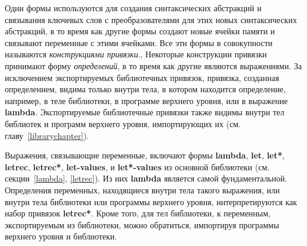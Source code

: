 Одни формы используются для создания синтаксических абстракций и связывания ключевых
слов с преобразователями для этих новых синтаксических абстракций, в то время как другие формы
создают новые ячейки памяти и связывают переменные с этими ячейками. Все эти
формы в совокупности называются {\em конструкциями привязки}., Некоторые
конструкции привязки принимают форму \textit{определений}, в то время как
другие являются выражениями. За исключением экспортируемых библиотечных привязок, привязка,
созданная определением, видима только внутри тела, в котором находится определение,
например, в теле библиотеки, в программе верхнего уровня, или в выражение {\cf\bfseries
  lambda}. Экспортируемые библиотечные привязки также видимы внутри тел библиотек и программ
верхнего уровня, импортирующих их (см. главу~\ref{librarychapter}).

Выражения, связывающие переменные, включают формы {\cf\bfseries lambda}, {\cf\bfseries let},
{\cf\bfseries let*}, {\cf\bfseries letrec}, {\cf\bfseries letrec*}, {\cf\bfseries let-values}, и
{\cf\bfseries let*-values} из основной библиотеки (см. секции~\ref{lambda}, \ref {letrec}). Из
них {\cf\bfseries lambda} является самой фундаментальной. Определения переменных, находящиеся внутри
тела такого выражения, или внутри тела библиотеки или программы верхнего уровня,
интерпретируются как набор привязок {\cf\bfseries letrec*}. Кроме того, для тел библиотеки, к переменным,
экспортируемым из библиотеки, можно обратиться, импортируя программы верхнего уровня и
библиотеки.

